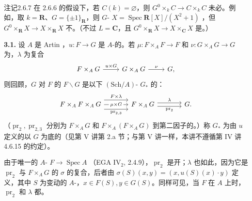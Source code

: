 \begin{SGAresult}{注记}{2.6.7}
在 2.6.6 的假设下，若 $C(k)=\varnothing$，则 $G^0\times_k C\to C\times_k C$ 未必。例如，取 $k=\mathbf R$、$G=\{\pm1\}_{\mathbf R}$，则 $G$- $X=\operatorname{Spec}\mathbf R[X]/(X^2+1)$ ，但 $G^0\times_{\mathbf R}X\to X\times_{\mathbf R}X$ 不。（不过 $L=\mathbf C$，且 $G^0\times_{\mathbf R}X\to X\times_{\mathbf C}X$ 是。）
\end{SGAresult}

\textbf{3.1.} 设 $A$ 是 Artin ，$u:F\to G$ 是 $A$-的。若 $\mu:F\times_A F\to F$ 和 $\nu:G\times_A G\to G$ 为，$\lambda$ 为复合
\[
\begin{tikzcd}
F\times_A G\arrow[r,"u\times G"]&G\times_A G\arrow[r,"\nu"]&G,
\end{tikzcd}
\]
则回顾，$G$ 对 $F$ 的 $F\backslash G$ 是以下 $(\mathrm{Sch}/A)$- $G_*$ 的：
\[
\begin{tikzcd}[column sep=large]
F\times_A F\times_A G\arrow[r,shift left=1.6ex,"F\times\lambda"]\arrow[r,"\mu\times G" description]\arrow[r,shift right=1.6ex,"{\operatorname{pr}_{2,3}}"']&F\times_A G\arrow[r,shift left=.6ex,"\lambda"]\arrow[r,shift right=.6ex,"\operatorname{pr}_2"']&G.
\end{tikzcd}
\]
（$\operatorname{pr}_2,\operatorname{pr}_{2,3}$ 分别为 $F\times_A G$ 和 $F\times_A(F\times_A G)$ 到第二因子的。）称 $G_*$ 为由 $u$ 定义的以 $G$ 为底的（见第 V 讲第 2.a 节；与第 V 讲一样，本讲不遵循第 IV 讲 4.6.15 的约定）。

由于唯一的 $A$- $F\to\operatorname{Spec}A$ （EGA IV$_2$, 2.4.9），$\operatorname{pr}_2$ 是开；$\lambda$ 也如此，因为它是 $\operatorname{pr}_2$ 与 $F\times_A G$ 的 $\sigma$ 的复合，后者由 $\sigma(S)(x,y)=(x,u(S)(x)\cdot y)$ 定义，其中 $S$ 为变动的 $A$-，$x\in F(S),y\in G(S)$。同样可见，当 $F$ 在 $A$ 上时，$\operatorname{pr}_2$ 和 $\lambda$ 都。

